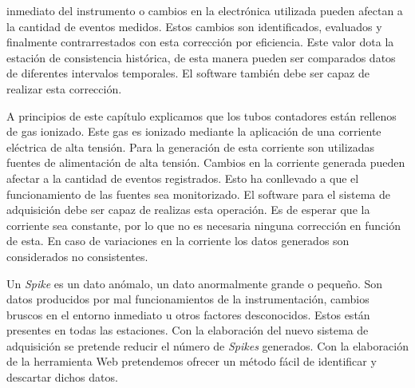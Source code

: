 \begin{description}[leftmargin=0cm]
			inmediato del instrumento o cambios en la electrónica utilizada pueden afectan a la cantidad de eventos medidos. Estos cambios
			son identificados, evaluados y finalmente contrarrestados con esta corrección por eficiencia. Este valor dota la estación de
			consistencia histórica, de esta manera pueden ser comparados datos de diferentes intervalos temporales. El software también
			debe ser capaz de realizar esta corrección. 
		\item[Fuentes de alta tensión]
			A principios de este capítulo explicamos que los tubos contadores están rellenos de gas ionizado. Este gas es ionizado
			mediante la aplicación de una corriente eléctrica de alta tensión. Para la generación de esta corriente son utilizadas fuentes
			de alimentación de alta tensión. Cambios en la corriente generada pueden afectar a la cantidad de eventos registrados. Esto ha
			conllevado a que el funcionamiento de las fuentes sea monitorizado. El software para el sistema de adquisición debe ser capaz
			de realizas esta operación. Es de esperar que la corriente sea constante, por lo que no es necesaria ninguna corrección en
			función de esta. En caso de variaciones en la corriente los datos generados son considerados no consistentes.
		\item[\emph{Spikes}]
			Un \emph{Spike} es un dato anómalo, un dato anormalmente grande o pequeño. Son datos producidos por mal funcionamientos de la
			instrumentación, cambios bruscos en el entorno inmediato u otros factores desconocidos. Estos están presentes en todas las
			estaciones. Con la elaboración del nuevo sistema de adquisición se pretende reducir el número de \emph{Spikes} generados. Con
			la elaboración de la herramienta Web pretendemos ofrecer un método fácil de identificar y descartar dichos datos.
	\end{description}
